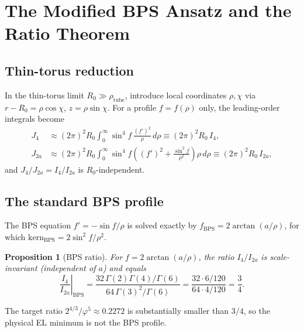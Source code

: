 \documentclass[11pt,a4paper]{article}
\newtheorem{proposition}[theorem]{Proposition}
\theoremstyle{definition}
\theoremstyle{remark}
\newcommand{\vp}{\varphi}
\newcommand{\Ja}{J_{2a}}
\newcommand{\Jfour}{J_{4}}
\begin{document}
\section{The Modified BPS Ansatz and the Ratio Theorem}
\label{P1:sec:bps}

\subsection{Thin-torus reduction}

In the thin-torus limit $R_0\gg\rho_{\mathrm{tube}}$, introduce local
coordinates $\rho,\chi$ via $r-R_0=\rho\cos\chi$, $z=\rho\sin\chi$.
For a profile $f=f(\rho)$ only, the leading-order integrals become
\begin{align}
  \Jfour &\approx (2\pi)^2 R_0\int_0^\infty \sin^4\!f\,\frac{(f')^2}{\rho}\,d\rho
          \equiv (2\pi)^2 R_0\,I_4, \\
  \Ja    &\approx (2\pi)^2 R_0\int_0^\infty \sin^4\!f\!\left((f')^2
          +\frac{\sin^2\!f}{\rho^2}\right)\!\rho\,d\rho
          \equiv (2\pi)^2 R_0\,I_{2a},
\end{align}
and $\Jfour/\Ja = I_4/I_{2a}$ is $R_0$-independent.

\subsection{The standard BPS profile}

The BPS equation $f' = -\sin f/\rho$ is solved exactly by
$f_{\mathrm{BPS}} = 2\arctan(a/\rho)$, for which $\mathrm{kern}_{\mathrm{BPS}}
= 2\sin^2\!f/\rho^2$.

\begin{proposition}[BPS ratio]
\label{P1:prop:bps}
For $f=2\arctan(a/\rho)$, the ratio $I_4/I_{2a}$ is scale-invariant
(independent of $a$) and equals
\begin{equation}
  \left.\frac{I_4}{I_{2a}}\right|_{\mathrm{BPS}}
  = \frac{32\,\Gamma(2)\Gamma(4)/\Gamma(6)}
         {64\,\Gamma(3)^2/\Gamma(6)}
  = \frac{32\cdot 6/120}{64\cdot 4/120}
  = \frac{3}{4}.
  \label{P1:eq:bps_ratio}
\end{equation}
\end{proposition}

The target ratio $2^{4/3}/\vp^5\approx 0.2272$ is substantially smaller
than $3/4$, so the physical EL minimum is not the BPS profile.
\end{document}
